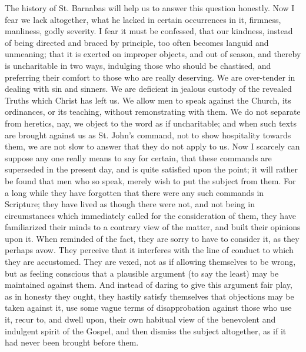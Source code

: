 The history of St. Barnabas will help us to answer this question
honestly. Now I fear we lack altogether, what he lacked in certain
occurrences in it, firmness, manliness, godly severity. I fear it must
be confessed, that our kindness, instead of being directed and braced by
principle, too often becomes languid and unmeaning; that it is exerted
on improper objects, and out of season, and thereby is uncharitable in
two ways, indulging those who should be chastised, and preferring their
comfort to those who are really deserving. We are over-tender in dealing
with sin and sinners. We are deficient in jealous custody of the
revealed Truths which Christ has left us. We allow men to speak against
the Church, its ordinances, or its teaching, without remonstrating with
them. We do not separate from heretics, nay, we object to the word as if
uncharitable; and when such texts are brought against us as St. John's
command, not to show hospitality towards them, we are not slow to answer
that they do not apply to us. Now I scarcely can suppose any one really
means to say for certain, that these commands are superseded in the
present day, and is quite satisfied upon the point; it will rather be
found that men who so speak, merely wish to put the subject from them.
For a long while they have forgotten that there were any such commands
in Scripture; they have lived as though there were not, and not being in
circumstances which immediately called for the consideration of them,
they have familiarized their minds to a contrary view of the matter, and
built their opinions upon it. When reminded of the fact, they are sorry
to have to consider it, as they perhaps avow. They perceive that it
interferes with the line of conduct to which they are accustomed. They
are vexed, not as if allowing themselves to be wrong, but as feeling
conscious that a plausible argument (to say the least) may be maintained
against them. And instead of daring to give this argument fair play, as
in honesty they ought, they hastily satisfy themselves that objections
may be taken against it, use some vague terms of disapprobation against
those who use it, recur to, and dwell upon, their own habitual view of
the benevolent and indulgent spirit of the Gospel, and then dismiss the
subject altogether, as if it had never been brought before them.

